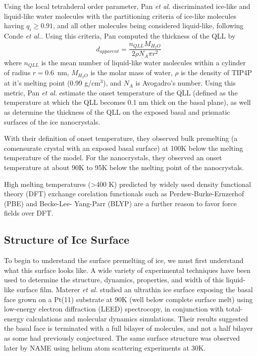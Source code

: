 Using the local tetrahderal order parameter, Pan \textit{et al.}
discriminated ice-like and liquid-like water molecules with the
partitioning criteria of ice-like molecules having $q_{i} \geq 0.91$,
and all other molecules being considered liquid-like, following Conde
\textit{et al.}.\cite{Conde2008} Using this criteria, Pan computed the
thickness of the QLL by
\begin{equation}
d_{apparent} = \frac{n_{QLL}M_{H_{2}O}}{2\rho N_{A} \pi r^{2}}
\end{equation}
where $n_{QLL}$ is the mean number of liquid-like water molecules
within a cylinder of radius $r = 0.6$~nm, $M_{H_{2}O}$ is the molar
mass of water, $\rho$ is the density of TIP4P at it's melting point
(0.99 g/cm$^{3}$\cite{Bluhm2000,Conde2008}), and $N_{A}$ is Avogadro's number.
Using this metric, Pan \textit{et al.} estimate the onset temperature
of the QLL (defined as the temperature at which the QLL becomes 0.1 nm
thick on the basal plane\cite{Conde2008}), as well as determine the thickness
of the QLL on the exposed basal and prismatic surfaces of the ice
nanocrystals. 

With their definition of onset temperature, they observed bulk
premelting (a comensurate crystal with an exposed basal surface) at
100K below the melting temperature of the model. For the nanocrystals,
they observed an onset temperature at about 90K to 95K below the
melting point of the nanocrystals. 

High melting temperatures (>400 K) predicted by widely used density
functional theory (DFT) exchange corelation functionals such as
Perdew-Burke-Ernzerhof (PBE)\cite{Perdew1996} and Becke-Lee- Yang-Parr
(BLYP)\cite{Becke1988,Sprik1996} are a further reason to favor force fields over
DFT.\cite{Yoo2009}



\subsection{Structure of Ice Surface}
To begin to understand the surface premelting of ice, we must first
understand what this surface looks like. A wide variety of
experimental techniques have been used to determine the structure,
dynamics, properties, and width of this liquid-like surface film.
Materer \textit{et al.} studied an ultrathin ice surface exposing the
basal face grown on a Pt(11) substrate at 90K (well below complete
surface melt) using low-energy electron diffraction (LEED)
spectrocopy, in conjunction with total-energy calculations and
molecular dynamics simulations.\cite{Materer1995,Materer1997} Their results suggested
the basal face is terminated with a full bilayer of molecules, and not
a half bilayer as some had previously conjectured. The same surface
structure was observed later by NAME using helium atom scattering
experiments at 30K.\cite{Braun1998,Glebov2000}

